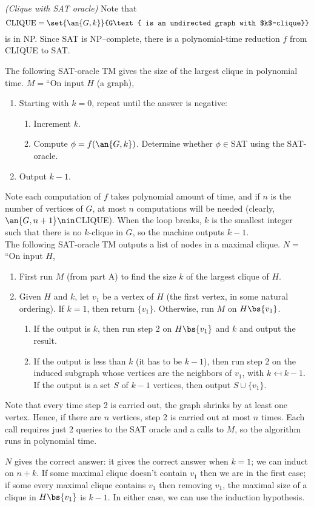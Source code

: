 \begin{problem}{\it(Clique with SAT oracle)}
Note that 
\[
\text{CLIQUE}=\set{\an{G,k}}{G\text{ is an undirected graph with $k$-clique}}
\]
is in NP. Since SAT is NP--complete, there is a polynomial-time reduction $f$ from CLIQUE to SAT.

The following SAT-oracle TM gives the size of the largest clique in polynomial time. $M=$``On input $H$ (a graph),
\begin{enumerate}
\item Starting with $k=0$, repeat until the answer is negative:
\begin{enumerate}
\item
Increment $k$.
\item
Compute $\phi=f(\an{G,k})$. Determine whether $\phi\in$SAT using the SAT-oracle.
\end{enumerate}
\item Output $k-1$.
\end{enumerate}
Note each computation of $f$ takes polynomial amount of time, and if $n$ is the number of vertices of $G$, at most $n$ computations will be needed (clearly, $\an{G,n+1}\nin$CLIQUE).
When the loop breaks, $k$ is the smallest integer such that there is no $k$-clique in $G$, so the machine outputs $k-1$.\\

The following SAT-oracle TM outputs a list of nodes in a maximal clique. $N=$``On input $H$,
\begin{enumerate}
\item
First run $M$ (from part A) to find the size $k$ of the largest clique of $H$.
\item
Given $H$ and $k$, let $v_1$ be a vertex of $H$ (the first vertex, in some natural ordering). %
If $k=1$, then return $\{v_1\}$. Otherwise,
run $M$ on $H\bs\{v_1\}$.
\begin{enumerate}
\item
If the output is $k$, then run step 2 on $H\bs \{v_1\}$ and $k$ and output the result.
\item
If the output is less than $k$ (it has to be $k-1$), then run step 2 on the induced subgraph whose vertices are the neighbors of $v_1$, with $k\mapsfrom k-1$. If the output is a set $S$ of $k-1$ vertices, then output $S\cup \{v_1\}$.
\end{enumerate}
\end{enumerate}
Note that every time step 2 is carried out, the graph shrinks by at least one vertex. Hence, if there are $n$ vertices, step 2 is carried out at most $n$ times. Each call requires just 2 queries to the SAT oracle and a calls to $M$, so the algorithm runs in polynomial time.

$N$ gives the correct answer: it gives the correct answer when $k=1$; we can induct on $n+k$. If some maximal clique doesn't contain $v_1$ then we are in the first case; if some every maximal clique contains $v_1$ then removing $v_1$, the maximal size of a clique in $H\bs \{v_1\}$ is $k-1$. In either case, we can use the induction hypothesis.
\end{problem}

